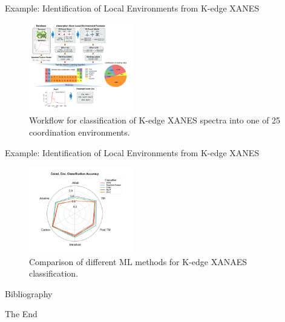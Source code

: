 \documentclass[aspectratio=169]{beamer}
\begin{document}
\begin{frame}{Example: Identification of Local Environments from K-edge XANES}
\begin{figure}
    \centering
    \includegraphics[width=0.4\textwidth]{figures/randomforestxanes.pdf}
    \caption{Workflow for classification of K-edge XANES spectra into one of 25 coordination environments.\cite{zhengRandomForestModels2019}}
\end{figure}
\end{frame}


\begin{frame}{Example: Identification of Local Environments from K-edge XANES}
\begin{figure}
    \centering
    \includegraphics[width=0.4\textwidth]{figures/coord_env_class_acc_radar.pdf}
    \caption{Comparison of different ML methods for K-edge XANAES classification.\cite{zhengRandomForestModels2019}}
\end{figure}
\end{frame}


\begin{frame}{Bibliography}
    
    
\end{frame}




\begin{frame}
    \Huge{\centerline{The End}}
\end{frame}
\end{document}
